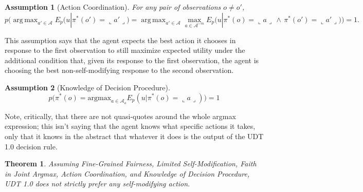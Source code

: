 \documentclass{article}
\newtheorem{assumption}{Assumption}
\newtheorem{theorem}{Theorem}
\DeclareMathOperator*{\argmax}{arg\,max}
\begin{document}
\begin{assumption}[Action Coordination]
For any pair of observations $o \neq o'$,
$$p \Big( \argmax_{a' \in \mathcal{A}} E_p \big( u | \pi^*(o') = \llcorner a' \lrcorner \big) = \argmax_{a' \in \mathcal{A}} \max_{a \in \mathcal{A}^{-m}} E_p \big( u | \pi^*(o) = \llcorner a \lrcorner \,\land\,\pi^*(o') = \llcorner a' \lrcorner \big) \Big) = 1.$$
\end{assumption} 

This assumption says that the agent expects the best action it chooses in response to the first observation to still maximize expected utility under the additional condition that, given its response to the first observation, the agent is choosing the best non-self-modifying response to the second observation.

\begin{assumption}[Knowledge of Decision Procedure]
    $$p\big(\pi^*(o)= \text{argmax}_{a \in \mathcal{A}_o} E_{p}(u|\pi^*(o)=\llcorner a \lrcorner) \big)=1$$
\end{assumption}

Note, critically, that there are not quasi-quotes around the whole argmax expression; this isn't saying that the agent knows what specific actions it takes, only that it knows in the abstract that whatever it does is the output of the UDT 1.0 decision rule.

\begin{theorem}\label{tiling}
Assuming Fine-Grained Fairness, Limited Self-Modification, Faith in Joint Argmax, Action Coordination, and Knowledge of Decision Procedure, UDT 1.0 does not strictly prefer any self-modifying action.
\end{theorem}
\end{document}
